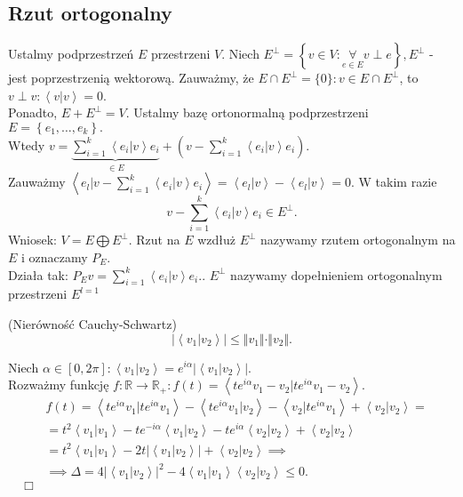 \documentclass[../main.tex]{subfiles}
\begin{document}
        \subsection{Rzut ortogonalny}
        Ustalmy podprzestrzeń $E$ przestrzeni $V$. Niech $E^\perp = \left\{ v\in V: \underset{e\in E}{\forall} v\perp e \right\}, E^\perp $ - jest poprzestrzenią wektorową.
        Zauważmy, że $E \cap E^\perp = \{0\}: v\in E \cap E^\perp$, to $v\perp v: \left<v|v \right> = 0$.\\
        Ponadto, $E+E^\perp = V$. Ustalmy bazę ortonormalną podprzestrzeni $E = \left\{ e_1,\ldots,e_k \right\} .$\\
        Wtedy $v = \underbrace{\sum_{i=1}^k \left<e_i | v \right>e_i}_{\in E} + \left(v- \sum_{i=1}^k \left<e_i|v\right>e_i\right)$.\\
        Zauważmy $\left<e_l | v - \sum_{i=1}^k \left<e_i|v \right>e_i\right> = \left<e_l | v \right> - \left<e_l | v \right> = 0$.
        W takim razie
        \[
            v - \sum_{i=1}^k \left<e_i|v \right>e_i \in E^\perp
        .\]
        Wniosek: $V = E \bigoplus  E^\perp$. Rzut na $E$ wzdłuż $E^\perp$ nazywamy rzutem ortogonalnym na $E$ i oznaczamy $P_E$.\\
        Działa tak: $P_E v = \sum_{i=1}^k \left<e_i | v \right>e_i.$. $E^\perp$ nazywamy dopełnieniem ortogonalnym przestrzeni $E^{l=1}$
         \begin{stw}
             (Nierówność Cauchy-Schwartz)\\
             \[
                 \left| \left<v_1|v_2 \right> \right| \le \Vert v_1 \Vert \cdot \Vert v_2 \Vert
             .\]
         \end{stw}
         \begin{dowod}
             Niech $\alpha \in [0,2\pi]:\left<v_1|v_2 \right> = e^{i\alpha}\left| \left<v_1|v_2 \right> \right| $.\\
             Rozważmy funkcję $f: \mathbb{R}\to \mathbb{R}_{+}: f(t) = \left<t e^{i \alpha}v_1 - v_2 | te^{i\alpha}v_1-v_2 \right>$.
             \begin{align*}
                 &f(t) = \left<te^{i\alpha}v_1 | te^{i\alpha}v_1 \right> - \left<te^{i\alpha}v_1|v_2 \right> - \left<v_2|te^{i\alpha}v_1 \right> + \left<v_2|v_2 \right> = \\
                 &= t^2 \left<v_1|v_1 \right> - te^{-i\alpha}\left<v_1|v_2 \right> - te^{i\alpha} \left<v_2|v_2 \right> + \left<v_2|v_2 \right> \\
                 &= t^2 \left<v_1|v_1 \right> - 2t\left| \left<v_1|v_2 \right> \right| + \left<v_2|v_2 \right> \implies\\
                 &\implies \Delta = 4\left| \left<v_1|v_2 \right> \right| ^2 - 4 \left<v_1|v_1 \right>\left<v_2 |v_2\right>\le 0
             .\end{align*}
             $\quad\Box$
         \end{dowod}
\end{document}

